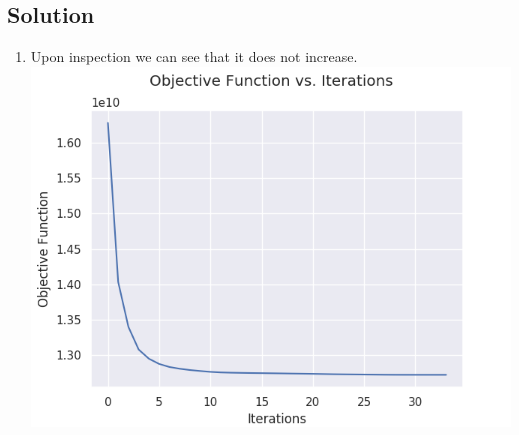 \documentclass[submit]{harvardml}
\begin{document}
\newpage

\subsection*{Solution}
\begin{enumerate}
    \item Upon inspection we can see that it does not increase.\newline
    \includegraphics[scale=.70]{hw4/Pics/Part1.png}
    

\end{enumerate}
\end{document}
